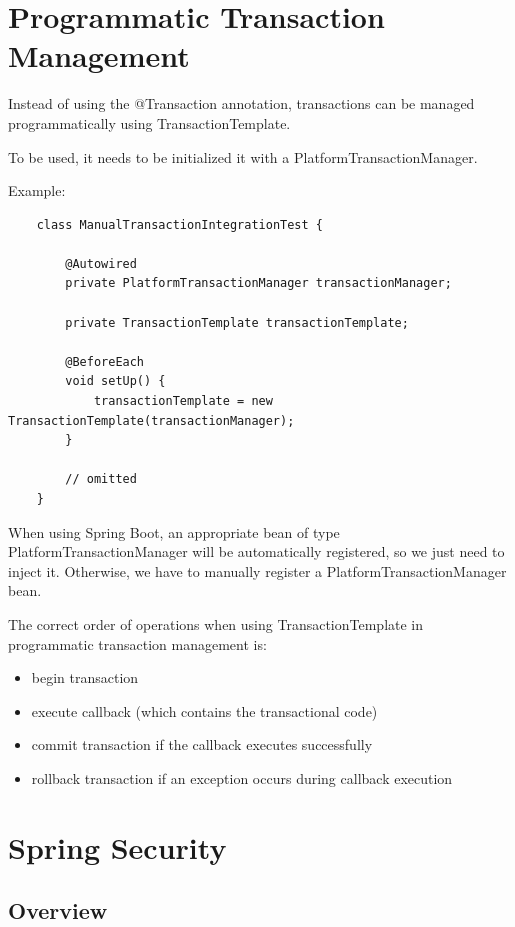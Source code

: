 \documentclass{scrartcl}
\begin{document}
\section{Programmatic Transaction Management}

Instead of using the @Transaction annotation, transactions can be managed programmatically using TransactionTemplate.

To be used, it needs to be initialized it with a PlatformTransactionManager.

Example:

\begin{lstlisting}
    class ManualTransactionIntegrationTest {

        @Autowired
        private PlatformTransactionManager transactionManager;

        private TransactionTemplate transactionTemplate;

        @BeforeEach
        void setUp() {
            transactionTemplate = new TransactionTemplate(transactionManager);
        }

        // omitted
    }
\end{lstlisting}

When using Spring Boot, an appropriate bean of type PlatformTransactionManager will be automatically registered, so we just need to inject it. Otherwise, we have to manually register a PlatformTransactionManager bean.

The correct order of operations when using TransactionTemplate in programmatic transaction management is:

\begin{itemize}
    \item begin transaction
    \item execute callback (which contains the transactional code)
    \item commit transaction if the callback executes successfully
    \item rollback transaction if an exception occurs during callback execution
\end{itemize}



\section{Spring Security}
\subsection{Overview}
\end{document}
